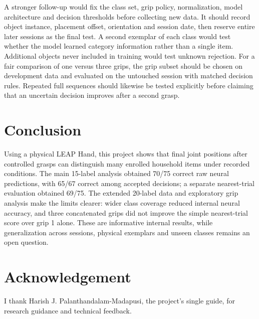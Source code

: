 \documentclass[12pt,a4paper]{article}
\begin{document}
A stronger follow-up would fix the class set, grip policy, normalization, model architecture and decision thresholds before collecting new data. It should record object instance, placement offset, orientation and session date, then reserve entire later sessions as the final test. A second exemplar of each class would test whether the model learned category information rather than a single item. Additional objects never included in training would test unknown rejection. For a fair comparison of one versus three grips, the grip subset should be chosen on development data and evaluated on the untouched session with matched decision rules. Repeated full sequences should likewise be tested explicitly before claiming that an uncertain decision improves after a second grasp.

\section{Conclusion}

Using a physical LEAP Hand, this project shows that final joint positions after controlled grasps can distinguish many enrolled household items under recorded conditions. The main 15-label analysis obtained 70/75 correct raw neural predictions, with 65/67 correct among accepted decisions; a separate nearest-trial evaluation obtained 69/75. The extended 20-label data and exploratory grip analysis make the limits clearer: wider class coverage reduced internal neural accuracy, and three concatenated grips did not improve the simple nearest-trial score over grip 1 alone. These are informative internal results, while generalization across sessions, physical exemplars and unseen classes remains an open question.

\section*{Acknowledgement}
I thank Harish J. Palanthandalam-Madapusi, the project's single guide, for research guidance and technical feedback.
\end{document}
